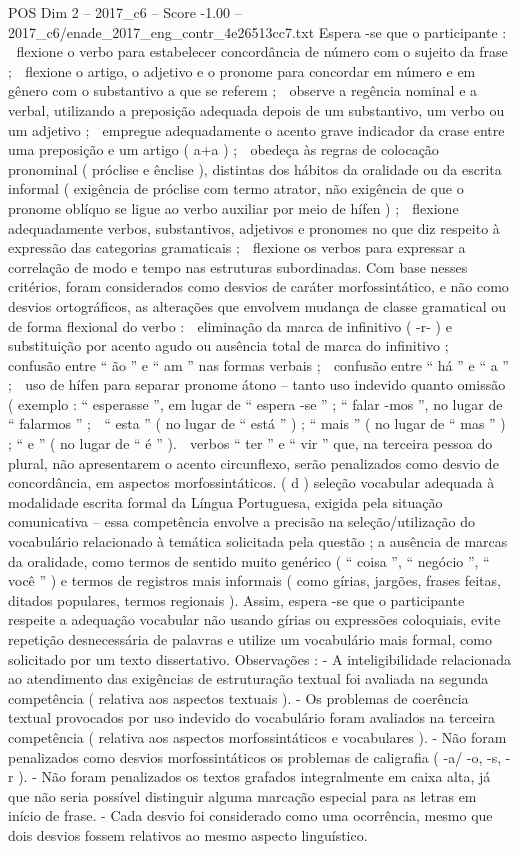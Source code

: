\begin{textsample}{POS Dim 2 – 2017\_c6 – Score -1.00 – 2017\_c6/enade\_2017\_eng\_contr\_4e26513cc7.txt}
Espera -se que o participante :  flexione o verbo para estabelecer concordância de número com o sujeito da frase ;  flexione o artigo, o adjetivo e o pronome para concordar em número e em gênero com o substantivo a que se referem ;  observe a regência nominal e a verbal, utilizando a preposição adequada depois de um substantivo, um verbo ou um adjetivo ;  empregue adequadamente o acento grave indicador da crase entre uma preposição e um artigo ( a+a ) ;  obedeça às regras de colocação pronominal ( próclise e ênclise ), distintas dos hábitos da oralidade ou da escrita informal ( exigência de próclise com termo atrator, não exigência de que o pronome oblíquo se ligue ao verbo auxiliar por meio de hífen ) ;  flexione adequadamente verbos, substantivos, adjetivos e pronomes no que diz respeito à expressão das categorias gramaticais ;  flexione os verbos para expressar a correlação de modo e tempo nas estruturas subordinadas.
Com base nesses critérios, foram considerados como desvios de caráter morfossintático, e não como desvios ortográficos, as alterações que envolvem mudança de classe gramatical ou de forma flexional do verbo :  eliminação da marca de infinitivo ( -r- ) e substituição por acento agudo ou ausência total de marca do infinitivo ;  confusão entre “ ão ” e “ am ” nas formas verbais ;  confusão entre “ há ” e “ a ” ;  uso de hífen para separar pronome átono – tanto uso indevido quanto omissão ( exemplo : “ esperasse ”, em lugar de “ espera -se ” ; “ falar -mos ”, no lugar de “ falarmos ” ;  “ esta ” ( no lugar de “ está ” ) ; “ mais ” ( no lugar de “ mas ” ) ; “ e ” ( no lugar de “ é ” ).  verbos “ ter ” e “ vir ” que, na terceira pessoa do plural, não apresentarem o acento circunflexo, serão penalizados como desvio de concordância, em aspectos morfossintáticos. ( d ) seleção vocabular adequada à modalidade escrita formal da Língua Portuguesa, exigida pela situação comunicativa – essa competência envolve a precisão na seleção/utilização do vocabulário relacionado à temática solicitada pela questão ; a ausência de marcas da oralidade, como termos de sentido muito genérico ( “ coisa ”, “ negócio ”, “ você ” ) e termos de registros mais informais ( como gírias, jargões, frases feitas, ditados populares, termos regionais ).
Assim, espera -se que o participante respeite a adequação vocabular não usando gírias ou expressões coloquiais, evite repetição desnecessária de palavras e utilize um vocabulário mais formal, como solicitado por um texto dissertativo.
Observações : - A inteligibilidade relacionada ao atendimento das exigências de estruturação textual foi avaliada na segunda competência ( relativa aos aspectos textuais ). - Os problemas de coerência textual provocados por uso indevido do vocabulário foram avaliados na terceira competência ( relativa aos aspectos morfossintáticos e vocabulares ). - Não foram penalizados como desvios morfossintáticos os problemas de caligrafia ( -a/ -o, -s, -r ). - Não foram penalizados os textos grafados integralmente em caixa alta, já que não seria possível distinguir alguma marcação especial para as letras em início de frase. - Cada desvio foi considerado como uma ocorrência, mesmo que dois desvios fossem relativos ao mesmo aspecto linguístico.

\end{textsample}
